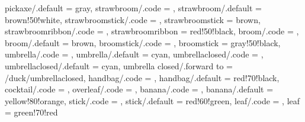 {  pickaxe/.default          = gray, 
  strawbroom/.code          = \duck@strawbroomtrue
                              \def\duck@strawbroom{#1},
  strawbroom/.default       = brown!50!white,
  strawbroomstick/.code     = \def\duck@strawbroomstick{#1},
  strawbroomstick           = brown,
  strawbroomribbon/.code    = \def\duck@strawbroomribbon{#1},
  strawbroomribbon          = red!50!black,
  broom/.code               = \duck@broomtrue
                              \def\duck@broom{#1},
  broom/.default            = brown,
  broomstick/.code          = \def\duck@broomstick{#1},
  broomstick                = gray!50!black,  
  umbrella/.code            = \duck@umbrellatrue
                              \def\duck@umbrella{#1},
  umbrella/.default         = cyan,      
  umbrellaclosed/.code      = \duck@umbrellaclosedtrue
                              \def\duck@umbrellaclosed{#1},
  umbrellaclosed/.default   = cyan,    
  umbrella closed/.forward to  = /duck/umbrellaclosed,
  handbag/.code             = \duck@handbagtrue
                              \def\duck@handbag{#1},
  handbag/.default          = red!70!black,  
  cocktail/.code            = \duck@cocktailtrue,
  overleaf/.code            = \duck@overleaftrue 
                              \def\duck@body{duck@overleafcol}
                              \duck@graduatetrue
                              \def\duck@graduate{black}
                              \duck@squareglassestrue
                              \def\duck@squareglasses{black},
  banana/.code              = \duck@bananatrue
                              \def\duck@banana{#1},
  banana/.default           = yellow!80!orange,
  stick/.code               = \duck@sticktrue
                              \def\duck@stick{#1},
  stick/.default            = red!60!green,
  leaf/.code                = \def\duck@leaf{#1},
  leaf                      = green!70!red
}

